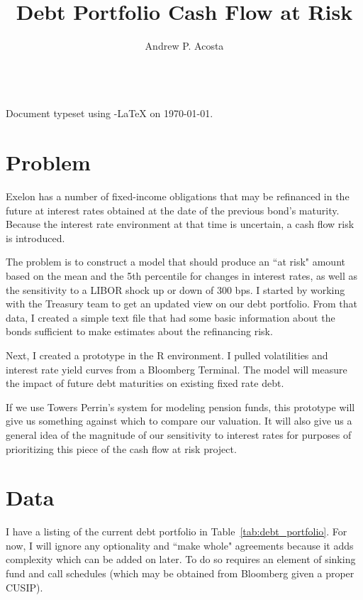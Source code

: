 \documentclass[11pt,twoside]{article}
\numberwithin{equation}{section}
\begin{document}
\title{Debt Portfolio Cash Flow at Risk}
\author{Andrew P. Acosta}

\maketitle
{} \\
{\tiny Document typeset using \AmS{}-\LaTeX{} on \today{}.}

\section{Problem}
Exelon has a number of fixed-income obligations that may be refinanced in the future at interest rates obtained at the date of the previous bond's maturity. Because the interest rate environment at that time is uncertain, a cash flow risk is introduced.

The problem is to construct a model that should produce an ``at risk" amount based on the mean and the 5th percentile for changes in interest rates, as well as the sensitivity to a LIBOR shock up or down of 300 bps.  I started by working with the Treasury team to get an updated view on our debt portfolio.  From that data, I created a simple text file that had some basic information about the bonds sufficient to make estimates about the refinancing risk.

Next, I created a prototype in the R environment. I pulled volatilities and interest rate yield curves from a Bloomberg Terminal.   The model will measure the impact of future debt maturities on existing fixed rate debt.  

If we use Towers Perrin's system for modeling pension funds, this prototype will give us something against which to compare our valuation.  It will also give us a general idea of the magnitude of our sensitivity to interest rates for purposes of prioritizing this piece of the cash flow at risk project.

\section{Data}
I have a listing of the current debt portfolio in Table~\ref{tab:debt_portfolio}. For now, I will ignore any optionality and ``make whole" agreements because it adds complexity which can be added on later. To do so requires an element of sinking fund and call schedules (which may be obtained from Bloomberg given a proper CUSIP).
\end{document}
